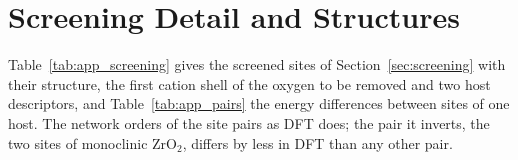 \section{Screening Detail and Structures}
\label{app:screening}

Table~\ref{tab:app_screening} gives the screened sites of Section~\ref{sec:screening} with their structure, the first cation shell of the oxygen to be removed and two host descriptors, and Table~\ref{tab:app_pairs} the energy differences between sites of one host. The network orders \numNetScreenPairsConcordant{} of the \numNetScreenPairs{} site pairs as DFT does; the pair it inverts, the two sites of monoclinic ZrO$_2$, differs by less in DFT than any other pair.

